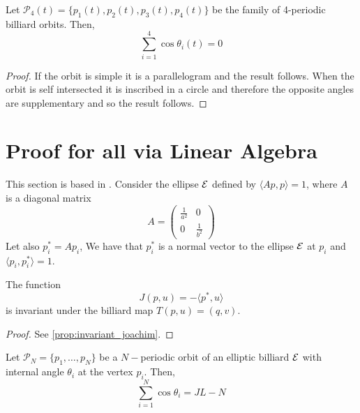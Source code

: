\begin{theorem}\label{thm:c4} Let $\mathcal{P}_4(t)=\{p_1(t),p_2(t),
p_3(t),p_4(t)\}$ 
be the family of 4-periodic billiard orbits.
Then,
\[\sum_{i=1}^4\cos \theta_i(t)=0\]
\label{th:soma_4cossenos}
\end{theorem}

\begin{proof}
If the orbit is simple it is a parallelogram and the result follows.
When the orbit is self intersected it is inscribed in a circle    and therefore the opposite angles are supplementary and so the result follows.
\end{proof}

\section{Proof for all  via Linear Algebra}
This section is based in   \cite{akopyan2020-invariants}.
Consider the ellipse $\mathcal{E}$ defined by $\langle Ap,p\rangle=1$, 
where $A$ is a diagonal matrix 
\[A=\left(\begin{matrix} \frac{1}{a^2} &0\\
0&\frac{1}{b^2}\end{matrix}\right)\]
Let also $p_i^*=Ap_i$, 
We have that $p_i^*$ is a normal vector to the ellipse $\mathcal{E}$ at $p_i$ and $\langle p_i,p_i^*\rangle=1.$
\begin{proposition}
The function
\[ J(p,u)=-\langle p^*,u\rangle\]
is invariant under the billiard map $T(p,u)=(q,v).$
\end{proposition}

\begin{proof}
See \cref{prop:invariant_joachim}.
\end{proof}

\begin{theorem} \label{th:soma_cossenos} Let   $\mathcal{P}_N=\{p_1,\ldots, p_N\}$ be a $N-$periodic orbit of an elliptic billiard $\mathcal{E}$ with internal angle $\theta_i$ at the vertex $p_i$. Then,
\[\sum_{i=1}^{N}\cos\theta_i=JL-N\]
\end{theorem}


